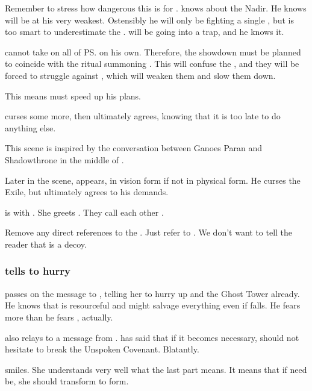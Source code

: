 Remember to stress how dangerous this is for \Ishnaruchaefir.
\Psyrex knows about the Nadir. 
He knows \Ishnaruchaefir will be at his very weakest. 
Ostensibly he will only be fighting a single \resphan, but \Psyrex is too smart to underestimate the \resphain.
\Ishnaruchaefir will be going into a trap, and he knows it. 

\Ishnaruchaefir{} cannot take on all of \ps{\Teshrial} \noggyaleth{} on his own. 
Therefore, the showdown must be planned to coincide with the ritual summoning \Nithdornazsh. 
This will confuse the \noggyaleth, and they will be forced to struggle against \Nithdornazsh, which will weaken them and slow them down. 

This means \Psyrex{} must speed up his plans. 

\Psyrex{} curses some more, then ultimately agrees, knowing that it is too late to do anything else. 

This scene is inspired by the conversation between Ganoes Paran and Shadowthrone in the middle of \cite{StevenErikson:TheBonehunters}. 

Later in the scene, \Secherdamon appears, in vision form if not in physical form. 
He curses the Exile, but ultimately agrees to his demands. 

\Criseis is with \Ishnaruchaefir. 
She greets \Psyrex. 
They call each other . 

Remove any direct references to the \Malcur \nexus. 
Just refer to . 
We don't want to tell the reader that \Forclin{} is a decoy. 





\subsubsection{\Psyrex tells \Nzessuacrith to hurry}
\Psyrex passes on the message to \Nzessuacrith, telling her to hurry up and  the Ghost Tower already. 
He knows that \Achsah{} is resourceful and might salvage everything even if \Teshrial{} falls.
He fears \Achsah more than he fears \Teshrial, actually. 

\Psyrex also relays to \Nzessuacrith a message from \Secherdamon.
\Secherdamon has said that if it becomes necessary, \Nzessuacrith should not hesitate to break the Unspoken Covenant.
Blatantly.

\Nzessuacrith smiles. 
She understands very well what the last part means.
It means that if need be, she should transform to \draconian form. 





